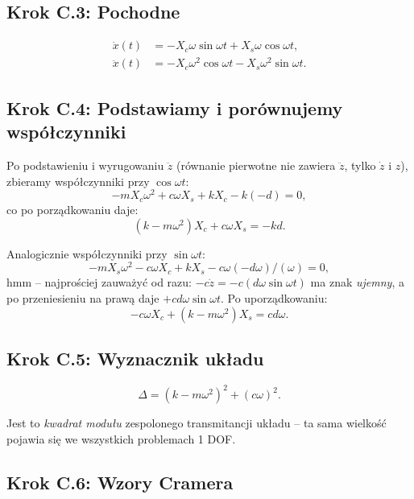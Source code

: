 \documentclass[11pt,a4paper]{article}
\theoremstyle{plainpol}
\begin{document}
\subsection*{Krok C.3: Pochodne}

\begin{align}
  \dot{x}(t) &= -X_c\omega\sin\omega t + X_s\omega\cos\omega t,\\
  \ddot{x}(t) &= -X_c\omega^2\cos\omega t - X_s\omega^2\sin\omega t.
\end{align}

\subsection*{Krok C.4: Podstawiamy i porównujemy współczynniki}

Po podstawieniu i wyrugowaniu $\ddot z$ (równanie pierwotne nie zawiera
$\ddot z$, tylko $\dot z$ i $z$), zbieramy współczynniki przy $\cos\omega t$:
\begin{equation}
  -mX_c\omega^2 + c\omega X_s + kX_c - k(-d) = 0,
\end{equation}
co po porządkowaniu daje:
\begin{equation}
  (k - m\omega^2)X_c + c\omega X_s = -kd. \tag{C-1}
\end{equation}

Analogicznie współczynniki przy $\sin\omega t$:
\begin{equation}
  -mX_s\omega^2 - c\omega X_c + kX_s - c\omega(-d\omega)/(\omega) = 0,
\end{equation}
hmm -- najprościej zauważyć od razu: $-c\dot z = -c(d\omega\sin\omega t)$
ma znak \emph{ujemny}, a po przeniesieniu na prawą daje $+cd\omega\sin\omega t$.
Po uporządkowaniu:
\begin{equation}
  -c\omega X_c + (k - m\omega^2)X_s = cd\omega. \tag{C-2}
\end{equation}

\subsection*{Krok C.5: Wyznacznik układu}

\begin{equation}
  \Delta = (k - m\omega^2)^2 + (c\omega)^2.
\end{equation}

Jest to \emph{kwadrat modułu} zespolonego transmitancji układu --
ta sama wielkość pojawia się we wszystkich problemach 1 DOF.

\subsection*{Krok C.6: Wzory Cramera}
\end{document}
